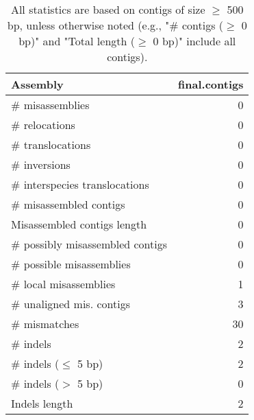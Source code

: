\documentclass[12pt,a4paper]{article}
\begin{document}
\begin{table}[ht]
\begin{center}
\caption{All statistics are based on contigs of size $\geq$ 500 bp, unless otherwise noted (e.g., "\# contigs ($\geq$ 0 bp)" and "Total length ($\geq$ 0 bp)" include all contigs).}
\begin{tabular}{|l*{1}{|r}|}
\hline
Assembly & final.contigs \\ \hline
\# misassemblies & 0 \\ \hline
\hspace{5mm}\# relocations & 0 \\ \hline
\hspace{5mm}\# translocations & 0 \\ \hline
\hspace{5mm}\# inversions & 0 \\ \hline
\hspace{5mm}\# interspecies translocations & 0 \\ \hline
\# misassembled contigs & 0 \\ \hline
Misassembled contigs length & 0 \\ \hline
\# possibly misassembled contigs & 0 \\ \hline
\hspace{5mm}\# possible misassemblies & 0 \\ \hline
\# local misassemblies & 1 \\ \hline
\# unaligned mis. contigs & 3 \\ \hline
\# mismatches & 30 \\ \hline
\# indels & 2 \\ \hline
\hspace{5mm}\# indels ($\leq$ 5 bp) & 2 \\ \hline
\hspace{5mm}\# indels ($>$ 5 bp) & 0 \\ \hline
Indels length & 2 \\ \hline
\end{tabular}
\end{center}
\end{table}
\end{document}
